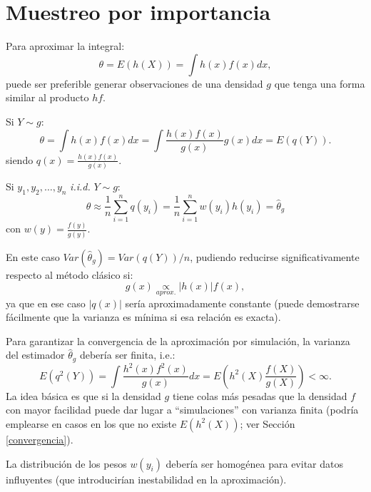 \documentclass[
  10pt,
]{book}
\theoremstyle{break}
\theoremstyle{nonumberplain}
\begin{document}
\hypertarget{muestreo-importancia}{%
\section{Muestreo por importancia}\label{muestreo-importancia}}

Para aproximar la integral:
\[\theta = E\left( h\left( X\right) \right) = \int h\left( x\right) f(x)dx,\]
puede ser preferible generar observaciones de una densidad \(g\) que tenga una forma similar al producto \(hf\).

Si \(Y\sim g\):
\[\theta  = \int h\left( x\right) f(x)dx 
 = \int \frac{h\left( x\right) f(x)}{g(x)}g(x)dx
 = E\left( q\left( Y\right) \right).\]
siendo
\(q\left( x\right) = \frac{h\left( x\right) f(x)}{g(x)}\).

Si \(y_1,y_2,\ldots ,y_n\) \emph{i.i.d.} \(Y\sim g\):
\[\theta \approx \frac{1}{n}\sum\limits_{i=1}^nq\left( y_i\right) 
= \frac{1}{n}\sum\limits_{i=1}^nw(y_i)h\left( y_i\right)  
= \hat{\theta}_{g}\]
con \(w(y) = \frac{f(y)}{g(y)}\).

En este caso \(Var(\hat{\theta}_{g}) = Var\left( q\left( Y\right) \right) /n\), pudiendo reducirse significativamente respecto al método clásico si:
\[g(x)\underset{aprox.}{\propto } \left\vert h(x) \right\vert f(x),\]
ya que en ese caso \(\left\vert q(x) \right\vert\) sería aproximadamente constante (puede demostrarse fácilmente que la varianza es mínima si esa relación es exacta).

Para garantizar la convergencia de la aproximación por simulación, la varianza del estimador \(\hat{\theta}_{g}\) debería ser finita, i.e.:
\[E\left( q^2\left( Y\right) \right)  
= \int \frac{h^2\left( x\right)f^2(x)}{g(x)}dx 
= E\left( h^2\left( X\right) \frac{f(X)}{g(X)}\right)
< \infty.\]
La idea básica es que si la densidad \(g\) tiene colas más pesadas que la densidad \(f\) con mayor facilidad puede dar lugar a ``simulaciones'' con varianza finita (podría emplearse en casos en los que no existe \(E \left( h^2 \left( X \right) \right)\); ver Sección \ref{convergencia}).

La distribución de los pesos \(w(y_i)\) debería ser homogénea para evitar datos influyentes (que introducirían inestabilidad en la aproximación).
\end{document}
